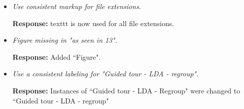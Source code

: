\documentclass[12pt]{article}
\begin{document}
\begin{itemize}
    \item \textit{ Use consistent markup for file extensions.}

    \textbf{Response:} texttt is now used for all file extensions.
    
    \item \textit{ Figure missing in "as seen in 13".}

    \textbf{Response:} Added ``Figure".
    
    \item \textit{Use a consistent labeling for "Guided tour - LDA - regroup".}

    \textbf{Response:} Instances of ``Guided tour - LDA - Regroup" were changed to ``Guided tour - LDA - regroup"
    
\end{itemize}
\end{document}

